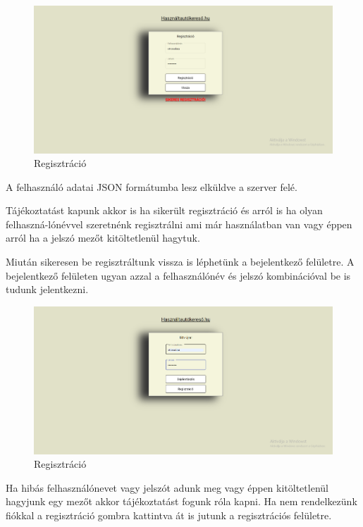 \begin{figure}[h]
\centering
\includegraphics[scale=0.37]{images/regisztracio.png}
\caption{Regisztráció}
\label{fig:regisztracio}
\end{figure}

A felhasználó adatai JSON formátumba lesz elküldve a szerver felé.

Tájékoztatást kapunk akkor is ha sikerült regisztráció és arról is ha olyan felhaszná-lónévvel szeretnénk regisztrálni ami már használatban van vagy éppen arról ha a jelszó mezőt kitöltetlenül hagytuk.

Miután sikeresen be regisztráltunk vissza is léphetünk a bejelentkező felületre.
A bejelentkező felületen ugyan azzal a felhasználónév és jelszó kombinációval be is tudunk jelentkezni.

\begin{figure}[h]
\centering
\includegraphics[scale=0.37]{images/bejelentkezes.png}
\caption{Regisztráció}
\label{fig:regisztracio}
\end{figure}

Ha hibás felhasználónevet vagy jelszót adunk meg vagy éppen kitöltetlenül hagyjunk egy mezőt akkor tájékoztatást fogunk róla kapni.
Ha nem rendelkezünk fiókkal a regisztráció gombra kattintva át is jutunk a regisztrációs felületre.

